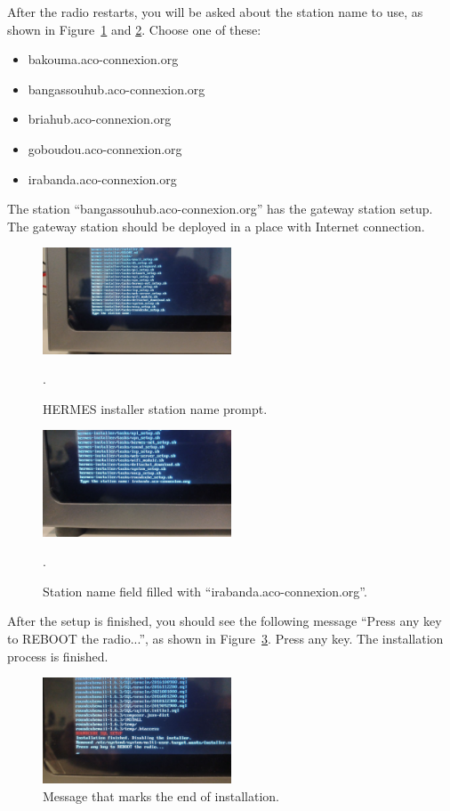 \documentclass[11pt,a4paper]{article}
\begin{document}
After the radio restarts, you will be asked about the station name to use, as shown in Figure~\ref{fig:inst5} and \ref{fig:inst6}. Choose one of these:
\begin{itemize}
\item bakouma.aco-connexion.org
\item bangassouhub.aco-connexion.org
\item briahub.aco-connexion.org
\item goboudou.aco-connexion.org
\item irabanda.aco-connexion.org
\end{itemize}

The station ``bangassouhub.aco-connexion.org'' has the gateway station setup. The gateway station should be deployed
in a place with Internet connection.

\begin{figure}[H]
  \centering
  \includegraphics[width=0.5\textwidth]{pictures/inst-5.jpg}
  \caption{HERMES installer station name prompt.}.
  \label{fig:inst5}
\end{figure}

\begin{figure}[H]
  \centering
  \includegraphics[width=0.5\textwidth]{pictures/inst-6.jpg}
  \caption{Station name field filled with ``irabanda.aco-connexion.org''.}.
  \label{fig:inst6}
\end{figure}

After the setup is finished, you should see the following message ``Press any key to REBOOT the radio...'', as shown in Figure~\ref{fig:inst7}. Press any key. The installation process is finished.


\begin{figure}[H]
  \centering
  \includegraphics[width=0.5\textwidth]{pictures/inst-7.jpg}
  \caption{Message that marks the end of installation.}
  \label{fig:inst7}
\end{figure}
\end{document}
